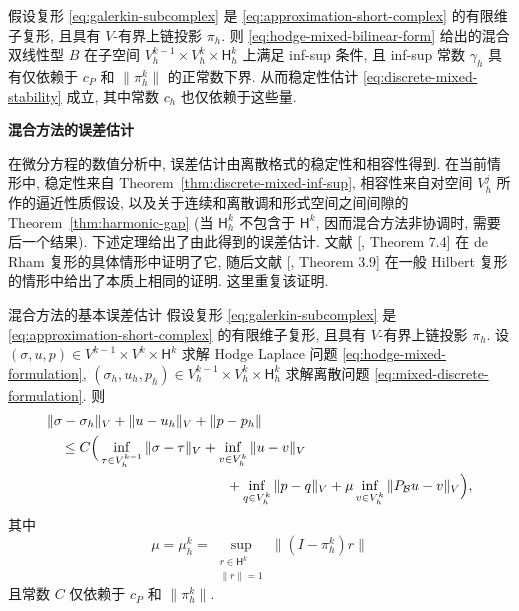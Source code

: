 
\begin{Theorem}\label{thm:discrete-mixed-inf-sup}
{假设复形 \eqref{eq:galerkin-subcomplex} 是 \eqref{eq:approximation-short-complex} 的有限维子复形, 且具有 $V$-有界上链投影 $\pi_h$. 则 \eqref{eq:hodge-mixed-bilinear-form} 给出的混合双线性型 $B$ 在子空间 $V_h^{k-1}\times V_h^k\times\mathsf H_h^k$ 上满足 inf-sup 条件, 且 inf-sup 常数 $\gamma_h$ 具有仅依赖于 $c_P$ 和 $\|\pi_h^k\|$ 的正常数下界. 从而稳定性估计 \eqref{eq:discrete-mixed-stability} 成立, 其中常数 $c_h$ 也仅依赖于这些量.}
\end{Theorem}

\medskip\noindent\textbf{{混合方法的误差估计}}\par
{在微分方程的数值分析中, 误差估计由离散格式的稳定性和相容性得到. 在当前情形中, 稳定性来自 Theorem~\ref{thm:discrete-mixed-inf-sup}, 相容性来自对空间 $V_h^j$ 所作的逼近性质假设, 以及关于连续和离散调和形式空间之间间隙的 Theorem~\ref{thm:harmonic-gap} (当 $\mathsf H_h^k$ 不包含于 $\mathsf H^k$, 因而混合方法非协调时, 需要后一个结果). 下述定理给出了由此得到的误差估计. 文献 [, Theorem 7.4] 在 de Rham 复形的具体情形中证明了它, 随后文献 [, Theorem 3.9] 在一般 Hilbert 复形的情形中给出了本质上相同的证明. 这里重复该证明.}


\begin{Theorem}{{混合方法的基本误差估计}}\label{thm:mixed-basic-error}
{假设复形 \eqref{eq:galerkin-subcomplex} 是 \eqref{eq:approximation-short-complex} 的有限维子复形, 且具有 $V$-有界上链投影 $\pi_h$. 设 $(\sigma,u,p)\in V^{k-1}\times V^k\times\mathsf H^k$ 求解 Hodge Laplace 问题 \eqref{eq:hodge-mixed-formulation}, $(\sigma_h,u_h,p_h)\in V_h^{k-1}\times V_h^k\times\mathsf H_h^k$ 求解离散问题 \eqref{eq:mixed-discrete-formulation}. 则}
\[
\begin{aligned}
&\|\sigma-\sigma_h\|_V+\|u-u_h\|_V+\|p-p_h\|\\
&\quad\leq C\Big(\inf_{\tau\in V_h^{k-1}}\|\sigma-\tau\|_V+\inf_{v\in V_h^k}\|u-v\|_V\\
&\hspace{45mm}+\inf_{q\in V_h^k}\|p-q\|_V+\mu\inf_{v\in V_h^k}\|P_{\mathcal B}u-v\|_V\Big),
\end{aligned}
\]
{其中}
\[
\mu=\mu_h^k=\sup_{\substack{r\in\mathsf H^k\\\|r\|=1}}\|(I-\pi_h^k)r\|
\]
{且常数 $C$ 仅依赖于 $c_P$ 和 $\|\pi_h^k\|$.}
\end{Theorem}

